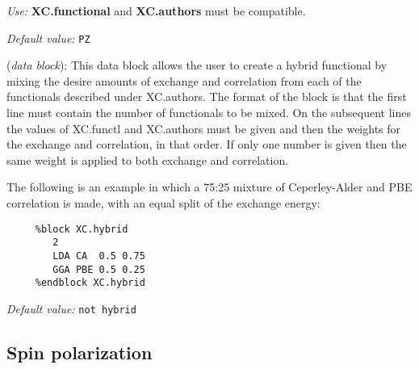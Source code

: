 \documentclass[11pt]{article}
\begin{document}
\begin{description}
\begin{itemize}
\end{itemize}

{\it Use:} {\bf XC.functional} and {\bf XC.authors} must be compatible.

{\it Default value:} {\tt PZ}

\item[{\bf XC.hybrid}] ({\it data block}): 
This data block allows the user to create a hybrid functional by
mixing the desire amounts of exchange and correlation from each of
the functionals described under XC.authors.
The format of the block is that the first line must contain the
number of functionals to be mixed. On the subsequent lines the
values of XC.functl and XC.authors must be given and then the
weights for the exchange and correlation, in that order. If only
one number is given then the same weight is applied to both
exchange and correlation.

The following is an example in which a 75:25 mixture of Ceperley-Alder
and PBE correlation is made, with an equal split of the exchange
energy:

\begin{verbatim}
     %block XC.hybrid
        2
        LDA CA  0.5 0.75
        GGA PBE 0.5 0.25
     %endblock XC.hybrid
\end{verbatim}

{\it Default value:} {\tt not hybrid}


\end{description}

\vspace{5pt}
\subsection{Spin polarization}
\end{document}
